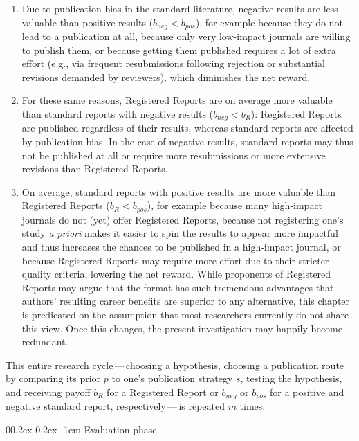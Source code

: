 \documentclass[
  ,man,mask,floatsintext]{apa6}
\makeatletter
\providecommand{\tightlist}{%
  \setlength{\itemsep}{0pt}\setlength{\parskip}{0pt}}
\let\oldparagraph\paragraph
\renewcommand{\paragraph}[1]{\oldparagraph{#1}\mbox{}}
\renewcommand{\paragraph}{\@startsection{paragraph}{4}{\parindent}%
  {0\baselineskip \@plus 0.2ex \@minus 0.2ex}%
  {-1em}%
  {\normalfont\normalsize\bfseries\itshape\typesectitle}}
\makeatother
\begin{document}
\begin{enumerate}
\def\labelenumi{\arabic{enumi}.}
\tightlist
\item
  Due to publication bias in the standard literature, negative results are less valuable than positive results (\(b_{neg} < b_{pos}\)), for example because they do not lead to a publication at all, because only very low-impact journals are willing to publish them, or because getting them published requires a lot of extra effort (e.g., via frequent resubmissions following rejection or substantial revisions demanded by reviewers), which diminishes the net reward.
\item
  For these same reasons, Registered Reports are on average more valuable than standard reports with negative results (\(b_{neg} < b_{R}\)): Registered Reports are published regardless of their results, whereas standard reports are affected by publication bias.
  In the case of negative results, standard reports may thus not be published at all or require more resubmissions or more extensive revisions than Registered Reports.
\item
  On average, standard reports with positive results are more valuable than Registered Reports (\(b_{R} < b_{pos}\)), for example because many high-impact journals do not (yet) offer Registered Reports, because not registering one's study \emph{a priori} makes it easier to spin the results to appear more impactful and thus increases the chances to be published in a high-impact journal, or because Registered Reports may require more effort due to their stricter quality criteria, lowering the net reward.
  While proponents of Registered Reports may argue that the format has such tremendous advantages that authors' resulting career benefits are superior to any alternative, this chapter is predicated on the assumption that most researchers currently do not share this view.
  Once this changes, the present investigation may happily become redundant.
\end{enumerate}

This entire research cycle\(\,\)---\(\,\)choosing a hypothesis, choosing a publication route by comparing its prior \(p\) to one's publication strategy \(s\), testing the hypothesis, and receiving payoff \(b_{R}\) for a Registered Report or \(b_{neg}\) or \(b_{pos}\) for a positive and negative standard report, respectively\(\,\)---\(\,\)is repeated \(m\) times.

\hypertarget{evaluation-phase}{%
\paragraph{Evaluation phase}\label{evaluation-phase}}
\end{document}

